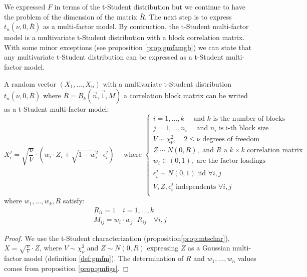 \documentclass[11pt,fleqn]{book} %
\begin{document}
We expressed $F$ in terms of the t-Student distribution but we continue to 
have the problem of the dimension of the matrix $\bar{R}$. The next step is
to express $t_n(\nu,0,\bar{R})$ as a multi-factor model.
By contruction, the t-Student multi-factor model is a multivariate
t-Student distribution with a block correlation matrix. With some
minor exceptions (see proposition \ref{prop:gmfamgb}) we can 
state that any multivariate t-Student distribution can be expressed
as a t-Student multi-factor model.

\begin{proposition}
	A random vector $(X_1,\dots,X_n)$ with a multivariate t-Student 
	distribution $t_n(\nu,0,\bar{R})$ where $\bar{R} = B_k(\vec{n},\vec{1},M)$ 
	a correlation block matrix can be writed as a t-Student multi-factor 
	model:
	\begin{displaymath}
		X_i^j = \sqrt{\frac{\nu}{V}} \cdot 
		\left( w_i \cdot Z_i + \sqrt{1-w_i^2} \cdot \epsilon_i^j \right)
		\quad \text{ where } \left\{
		\begin{array}{l}
			i = 1, \dots, k \quad \text{ and $k$ is the number of blocks}    \\
			j = 1, \dots, n_i \quad \text{ and $n_i$ is i-th block size}     \\
			V \sim \chi_{\nu}^2, \quad 2 \le \nu \text{ degrees of freedom}  \\
			Z \sim N(0,R), \text{ and $R$ a $k {\times} k$ correlation matrix} \\
			w_i \in (0,1), \text{ are the factor loadings }                  \\
			\epsilon_i^j \sim N(0,1) \text { iid } \forall i,j               \\
			V, Z, \epsilon_i^j \text{ independents } \forall i,j             \\
		\end{array}
		\right.
	\end{displaymath}
	where $w_1,\dots,w_k, R$ satisfy:
	\begin{displaymath}
		\begin{array}{l}
			R_{ii} = 1 \quad i = 1,\dots,k \\
			M_{ij} = w_i \cdot w_j \cdot R_{ij} \quad \forall i,j
		\end{array}
	\end{displaymath}
\end{proposition}

\begin{proof}
	We use the t-Student characterization (proposition\ref{prop:mtschar}),
	$X = \sqrt{\frac{\nu}{V}} \cdot Z$, where $V \sim \chi_{\nu}^2$ and 
	$Z \sim N(0,R)$ expressing $Z$ as a Gaussian multi-factor model 
	(definition \ref{def:gmfm}). The determination of $R$ and $w_1,\dots,w_n$
	values comes from proposition \ref{prop:gmfigs}.
\end{proof}
\end{document}
